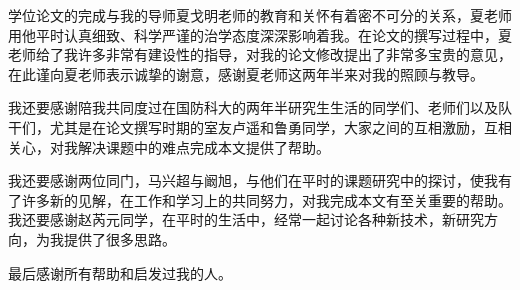

\begin{ack}
学位论文的完成与我的导师夏戈明老师的教育和关怀有着密不可分的关系，夏老师用他平时认真细致、科学严谨的治学态度深深影响着我。在论文的撰写过程中，夏老师给了我许多非常有建设性的指导，对我的论文修改提出了非常多宝贵的意见，在此谨向夏老师表示诚挚的谢意，感谢夏老师这两年半来对我的照顾与教导。

我还要感谢陪我共同度过在国防科大的两年半研究生生活的同学们、老师们以及队干们，尤其是在论文撰写时期的室友卢遥和鲁勇同学，大家之间的互相激励，互相关心，对我解决课题中的难点完成本文提供了帮助。


我还要感谢两位同门，马兴超与阚旭，与他们在平时的课题研究中的探讨，使我有了许多新的见解，在工作和学习上的共同努力，对我完成本文有至关重要的帮助。我还要感谢赵芮元同学，在平时的生活中，经常一起讨论各种新技术，新研究方向，为我提供了很多思路。

最后感谢所有帮助和启发过我的人。

\end{ack}
